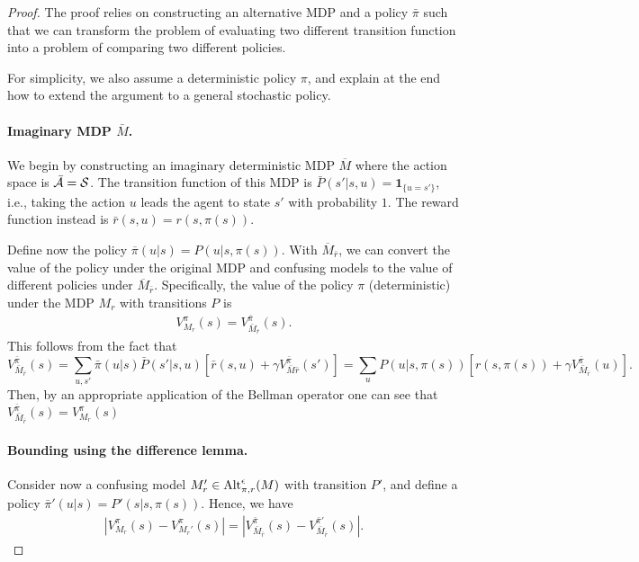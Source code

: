 \begin{proof}
The proof relies on constructing an alternative MDP and a policy $\bar \pi$ such that we can transform  the problem of evaluating two different transition function into a problem of comparing two different policies.

For simplicity, we also assume a deterministic policy $\pi$, and explain at the end how to extend the argument to a general stochastic policy.

\paragraph{Imaginary MDP $\bar M$.}
 We begin by constructing an imaginary deterministic MDP $\overline M$ where the action space is $\bar {{\cal A}}={\cal S}$.
The transition function of this MDP is $\bar P(s'|s,u)=\mathbf{1}_{\{u=s'\}}$, i.e., taking the action $u$ leads the agent to state $s'$ with probability $1$.
The reward function instead is $\bar r(s,u)=r(s,\pi(s))$.

Define now the policy $\overline{\pi}(u|s) = P(u|s,\pi(s))$. 
    With $\overline M_{\bar r}$, we can convert the value of the policy under the original MDP and confusing models to the value of different policies under $\overline M_{\bar r}$. Specifically, the value of the policy $\pi$ (deterministic) under the MDP $M_r$ with transitions $P$ is 
    \begin{align*}
        V^\pi_{M_r}(s) = V^{\bar \pi}_{\bar M_{\bar r}}(s).
    \end{align*} This follows from the fact that
    \[
     V^{\bar \pi}_{\bar M_{\bar r}}(s) = \sum_{u,s'} \bar \pi(u|s) \bar P(s'|s,u) [\bar r(s,u) + \gamma V_{\bar M{\bar r}}^{\bar \pi}(s')] = \sum_{u} P(u|s,\pi(s))  [r(s,\pi(s)) + \gamma V_{\bar M_{\bar r}}^{\bar \pi}(u)].
    \]
    Then, by an appropriate application of  the Bellman operator one can see that $V^{\bar \pi}_{\bar M_{\bar r}}(s) =V^{ \pi}_{M_r}(s) $
    
\paragraph{Bounding using the difference lemma.}
    Consider now a confusing model $M_r'\in {\rm Alt}_{\pi,r}^\epsilon(M)$ with transition $P'$, and  define a policy $\bar \pi'(u|s)=P'(s|s,\pi(s))$.
    Hence, we have
    \begin{align}
    \label{eq:mdp_to_policy}
        |V^\pi_{M_r}(s)-V^\pi_{M_r'}(s)|=|V^{\bar \pi}_{\bar M_{\bar r}}(s)- V^{\bar \pi'}_{\bar M_{\bar r}}(s)|.
    \end{align}


\end{proof}
